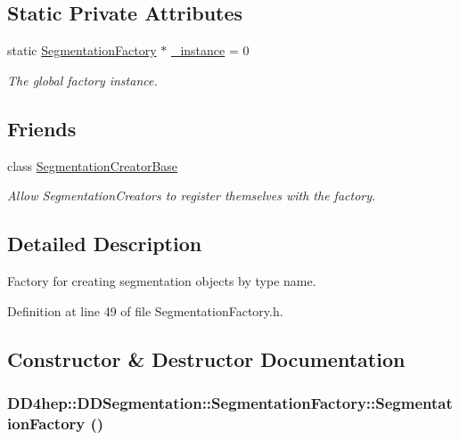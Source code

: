 \subsection*{Static Private Attributes}
\begin{DoxyCompactItemize}
\item 
static \hyperlink{class_d_d4hep_1_1_d_d_segmentation_1_1_segmentation_factory}{SegmentationFactory} $\ast$ \hyperlink{class_d_d4hep_1_1_d_d_segmentation_1_1_segmentation_factory_a1feb10e4594795939255eb57b80a76dd}{\_\-instance} = 0
\begin{DoxyCompactList}\small\item\em The global factory instance. \item\end{DoxyCompactList}\end{DoxyCompactItemize}
\subsection*{Friends}
\begin{DoxyCompactItemize}
\item 
class \hyperlink{class_d_d4hep_1_1_d_d_segmentation_1_1_segmentation_factory_ab25c2677f6e2445716078cc5c9e87009}{SegmentationCreatorBase}
\begin{DoxyCompactList}\small\item\em Allow SegmentationCreators to register themselves with the factory. \item\end{DoxyCompactList}\end{DoxyCompactItemize}


\subsection{Detailed Description}
Factory for creating segmentation objects by type name. 

Definition at line 49 of file SegmentationFactory.h.

\subsection{Constructor \& Destructor Documentation}
\hypertarget{class_d_d4hep_1_1_d_d_segmentation_1_1_segmentation_factory_af28879ad5d0b45254c69234ec4a90fe5}{
\subsubsection[{SegmentationFactory}]{\setlength{\rightskip}{0pt plus 5cm}DD4hep::DDSegmentation::SegmentationFactory::SegmentationFactory ()}}
\label{class_d_d4hep_1_1_d_d_segmentation_1_1_segmentation_factory_af28879ad5d0b45254c69234ec4a90fe5}


